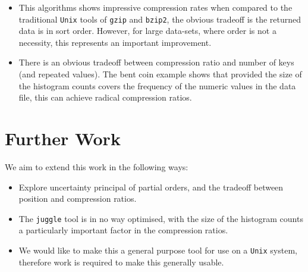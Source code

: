 \documentclass[a0paper,fleqn]{betterposter}
\begin{document}
{\begin{itemize}
\item This algorithms shows impressive compression rates when compared to the traditional \texttt{Unix} tools of \texttt{gzip} and \texttt{bzip2}, the obvious tradeoff is the returned data is in sort order. However, for large data-sets, where order is not a necessity, this represents an important improvement. 
\item There is an obvious tradeoff between compression ratio and number of keys (and repeated values). The bent coin example shows that provided the size of the histogram counts covers the frequency of the numeric values in the data file, this can achieve radical compression ratios. 
\end{itemize}

\section{Further Work}
We aim to extend this work in the following ways:
\begin{itemize}
\item Explore uncertainty principal of partial orders, and the tradeoff between position and compression ratios.
\item The \texttt{juggle} tool is in no way optimised, with the size of the histogram counts a particularly important factor in the compression ratios. 
\item We would like to make this a general purpose tool for use on a \texttt{Unix} system, therefore work is required to make this generally usable.
\end{itemize}
\vfill



}
\end{document}
